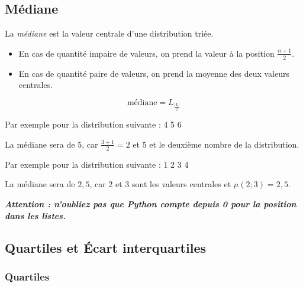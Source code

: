 \subsection{Médiane}

\noindent La \textit{médiane} est la valeur centrale d'une distribution triée.

\begin{itemize}
\item En cas de quantité impaire de valeurs, on prend la valeur à la position $ \frac{n + 1}{2} $.
\item En cas de quantité paire de valeurs, on prend la moyenne des deux valeurs centrales.
\end{itemize}

\begin{center} %
\begin{equation*}
\text{médiane} = L_{\frac{|L|}{2}}
\end{equation*}
\end{center}

\bigskip

\noindent Par exemple pour la distribution suivante : 4 5 6

\noindent La médiane sera de $ 5 $, car $ \frac{3 + 1}{2} = 2 $ et $ 5 $ et le deuxième nombre de la distribution.

\bigskip

\noindent Par exemple pour la distribution suivante : 1 2 3 4

\noindent La médiane sera de $ 2,5 $, car $ 2 $ et $ 3 $ sont les valeurs centrales et $ \mu(2 ; 3) = 2,5 $.

\bigskip

\noindent \textbf{\textit{Attention : n'oubliez pas que Python compte depuis 0 pour la position dans les listes.}}



\bigskip


\subsection{Quartiles et \'Ecart interquartiles}

\subsubsection{Quartiles}

